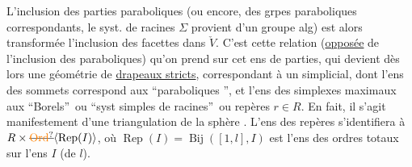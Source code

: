 L'inclusion des parties paraboliques (ou encore, des grpes paraboliques correspondants,  le syst. de racines $\Sigma$ provient d'un groupe alg) est alors transformée   l'inclusion des facettes dans $\check V$. C'est cette relation (\uline{opposée} de l'inclusion des paraboliques) qu'on prend sur cet  ens de parties, qui devient dès lors une géométrie de \uline{drapeaux stricts}, correspondant à un  simplicial, dont l'ens des sommets  correspond aux \textquotedblleft paraboliques \textquotedblright, et l'ens des simplexes maximaux aux \textquotedblleft Borels\textquotedblright\ ou \textquotedblleft syst simples de racines\textquotedblright\ ou repères $r\in R$. En fait, il s'agit manifestement d'une triangulation de la sphère . L'ens des repères s'identifiera à $R\times\deleted{\unsure{\mathrm{Ord}}}\inserted{\operatorname{Rep}(I)}$, où $\operatorname{Rep}(I)=\operatorname{Bij}([1,l],I)$ est l'ens des ordres totaux sur l'ens $I$ (de  $l$).

